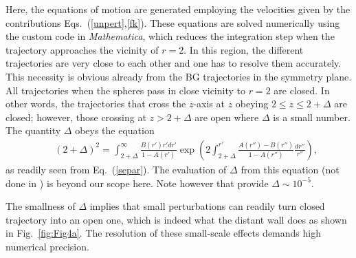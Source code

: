 Here, the equations of motion are generated employing the velocities given by the contributions Eqs.\ (\ref{unpert},\ref{fk}). These equations
are solved numerically using the custom code in {\it Mathematica}, which reduces the integration step when the trajectory approaches the
vicinity of $r = 2$. In this region, the different trajectories are very close to each other and one has to resolve them accurately. This necessity is obvious already from the BG trajectories in the symmetry plane. All trajectories when the spheres pass in close vicinity to $r=2$ are closed. In other words, the trajectories that cross the $z$-axis at $z$ obeying $2\leq z\leq 2+\Delta$ are closed; however, those crossing at $z>2+\Delta$ are open where $\Delta$ is a small number. The quantity $\Delta$ obeys the equation
\begin{eqnarray}&&\!\!\!\!\!\!\!\!\!\!
(2+\Delta)^2\!=\int_{2+\Delta}^{\infty}\!\!\!\frac{B(r')r'dr'}{1\!-\!A(r')}\exp\left(2\int_{2+\Delta}^{r'}\frac{A(r'')\!-\!B(r'')}{1\!-\!A(r'')}\frac{dr''}{r''}\right),
\end{eqnarray}
as readily seen from Eq.~(\ref{separ}). The evaluation of $\Delta$ from this equation (not done in \cite{batchelor_green_1972}) is beyond our scope here. Note however that \cite{arp} provide $\Delta\sim 10^{-5}$.

The smallness of $\Delta$ implies that small perturbations can readily turn closed trajectory into an open one, which is indeed what the distant wall does as shown
in Fig.~\ref{fig:Fig4a}. The resolution of these small-scale effects demands high numerical precision.


